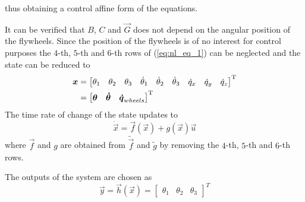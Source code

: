thus obtaining a control affine form of the equations.
\par
It can be verified that $B$, $C$ and $\vec{G}$ does not depend on the angular position of the flywheels.
Since the position of the flywheels is of no interest for control purposes the $4$-th, $5$-th and $6$-th rows
of (\ref{eq:nl_eq_1}) can be neglected and the state can be reduced to
\[
\begin{split}
  \boldsymbol{x} &=
  \begin{bmatrix}
    \theta_1 & \theta_2 & \theta_3 & \dot{\theta}_1 & \dot{\theta}_2 & \dot{\theta}_3 & \dot{q}_x & \dot{q}_y & \dot{q}_z
  \end{bmatrix}^{\mathrm{T}}\\
  &=\begin{bmatrix}
  \boldsymbol{\theta} & \boldsymbol{\dot{\theta}} & \boldsymbol{\dot{q}}_{wheels}
  \end{bmatrix}^{\mathrm{T}}
\end{split}
\]
The time rate of change of the state updates to
\begin{equation}\label{eq:nl_eq_2}
  \dot{\vec{x}} = \vec{f}(\vec{x}) + g(\vec{x}) \vec{u}
\end{equation}
where $\vec{f}$ and $g$ are obtained from $\tilde{\vec{f}}$ and
$\tilde{g}$ by removing the $4$-th, $5$-th and $6$-th rows.
\par
The outputs of the system are chosen as
\begin{equation}\label{eq:output}
\vec{y} = \vec{h}(\vec{x}) =
\begin{bmatrix}
  \theta_1 &
  \theta_2 &
  \theta_3
\end{bmatrix}^T
\end{equation}

